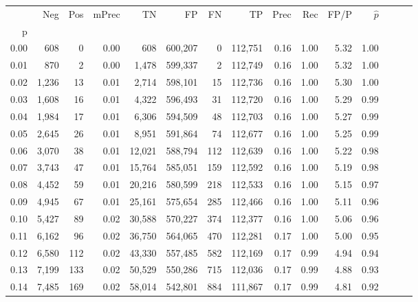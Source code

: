 \begin{tabular}{rrrrrrrrrrrrrrr}
\toprule
{} &     Neg &    Pos & mPrec &       TN &       FP &       FN &       TP &  Prec &   Rec &  FP/P & $\hat{p}$ \\
p    &         &        &       &          &          &          &          &       &       &       &           \\
\midrule
0.00 &     608 &      0 &  0.00 &      608 &  600,207 &        0 &  112,751 &  0.16 &  1.00 &  5.32 &      1.00 \\
0.01 &     870 &      2 &  0.00 &    1,478 &  599,337 &        2 &  112,749 &  0.16 &  1.00 &  5.32 &      1.00 \\
0.02 &   1,236 &     13 &  0.01 &    2,714 &  598,101 &       15 &  112,736 &  0.16 &  1.00 &  5.30 &      1.00 \\
0.03 &   1,608 &     16 &  0.01 &    4,322 &  596,493 &       31 &  112,720 &  0.16 &  1.00 &  5.29 &      0.99 \\
0.04 &   1,984 &     17 &  0.01 &    6,306 &  594,509 &       48 &  112,703 &  0.16 &  1.00 &  5.27 &      0.99 \\
0.05 &   2,645 &     26 &  0.01 &    8,951 &  591,864 &       74 &  112,677 &  0.16 &  1.00 &  5.25 &      0.99 \\
0.06 &   3,070 &     38 &  0.01 &   12,021 &  588,794 &      112 &  112,639 &  0.16 &  1.00 &  5.22 &      0.98 \\
0.07 &   3,743 &     47 &  0.01 &   15,764 &  585,051 &      159 &  112,592 &  0.16 &  1.00 &  5.19 &      0.98 \\
0.08 &   4,452 &     59 &  0.01 &   20,216 &  580,599 &      218 &  112,533 &  0.16 &  1.00 &  5.15 &      0.97 \\
0.09 &   4,945 &     67 &  0.01 &   25,161 &  575,654 &      285 &  112,466 &  0.16 &  1.00 &  5.11 &      0.96 \\
0.10 &   5,427 &     89 &  0.02 &   30,588 &  570,227 &      374 &  112,377 &  0.16 &  1.00 &  5.06 &      0.96 \\
0.11 &   6,162 &     96 &  0.02 &   36,750 &  564,065 &      470 &  112,281 &  0.17 &  1.00 &  5.00 &      0.95 \\
0.12 &   6,580 &    112 &  0.02 &   43,330 &  557,485 &      582 &  112,169 &  0.17 &  0.99 &  4.94 &      0.94 \\
0.13 &   7,199 &    133 &  0.02 &   50,529 &  550,286 &      715 &  112,036 &  0.17 &  0.99 &  4.88 &      0.93 \\
0.14 &   7,485 &    169 &  0.02 &   58,014 &  542,801 &      884 &  111,867 &  0.17 &  0.99 &  4.81 &      0.92 \\

\end{tabular}
